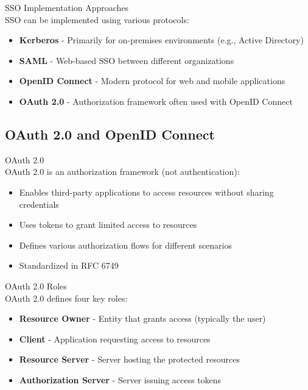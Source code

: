 \begin{concept}{SSO Implementation Approaches}\\
SSO can be implemented using various protocols:
\begin{itemize}
    \item \textbf{Kerberos} - Primarily for on-premises environments (e.g., Active Directory)
    \item \textbf{SAML} - Web-based SSO between different organizations
    \item \textbf{OpenID Connect} - Modern protocol for web and mobile applications
    \item \textbf{OAuth 2.0} - Authorization framework often used with OpenID Connect
\end{itemize}
\end{concept}

\subsection{OAuth 2.0 and OpenID Connect}

\begin{definition}{OAuth 2.0}\\
OAuth 2.0 is an authorization framework (not authentication):
\begin{itemize}
    \item Enables third-party applications to access resources without sharing credentials
    \item Uses tokens to grant limited access to resources
    \item Defines various authorization flows for different scenarios
    \item Standardized in RFC 6749
\end{itemize}
\end{definition}

\begin{concept}{OAuth 2.0 Roles}\\
OAuth 2.0 defines four key roles:
\begin{itemize}
    \item \textbf{Resource Owner} - Entity that grants access (typically the user)
    \item \textbf{Client} - Application requesting access to resources
    \item \textbf{Resource Server} - Server hosting the protected resources
    \item \textbf{Authorization Server} - Server issuing access tokens
\end{itemize}
\end{concept}

